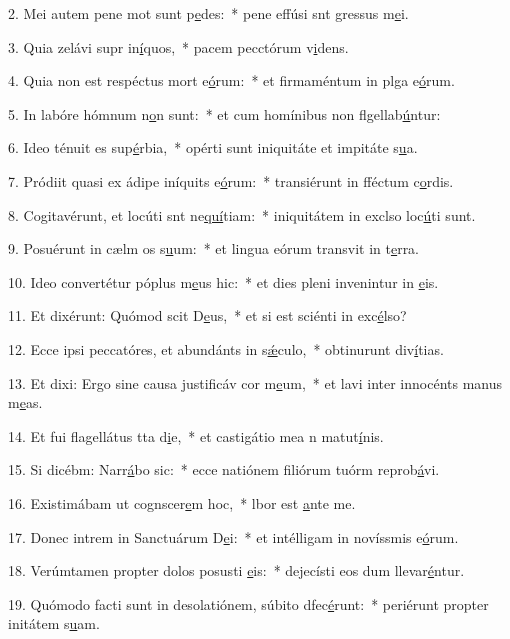 2. Mei autem pene mot sunt p\uline{e}des:~* pene effúsi snt gressus m\uline{e}i.\par 
3. Quia zelávi supr in\uline{í}quos,~* pacem pecctórum v\uline{i}dens.\par 
4. Quia non est respéctus mort e\uline{ó}rum:~* et firmaméntum in plga e\uline{ó}rum.\par 
5. In labóre hómnum n\uline{o}n sunt:~* et cum homínibus non flgellab\uline{ú}ntur:\par 
6. Ideo ténuit es sup\uline{é}rbia,~* opérti sunt iniquitáte et impitáte s\uline{u}a.\par 
7. Pródiit quasi ex ádipe iníquits e\uline{ó}rum:~* transiérunt in fféctum c\uline{o}rdis.\par 
8. Cogitavérunt, et locúti snt ne\uline{quí}tiam:~* iniquitátem in exclso loc\uline{ú}ti sunt.\par 
9. Posuérunt in cælm os s\uline{u}um:~* et lingua eórum transvit in t\uline{e}rra.\par 
10. Ideo convertétur póplus m\uline{e}us hic:~* et dies pleni invenintur in \uline{e}is.\par 
11. Et dixérunt: Quómod scit D\uline{e}us,~* et si est sciénti in exc\uline{é}lso?\par 
12. Ecce ipsi peccatóres, et abundánts in s\uline{ǽ}culo,~* obtinurunt div\uline{í}tias.\par 
13. Et dixi: Ergo sine causa justificáv cor m\uline{e}um,~* et lavi inter innocénts manus m\uline{e}as.\par 
14. Et fui flagellátus tta d\uline{i}e,~* et castigátio mea n matut\uline{í}nis.\par 
15. Si dicébm: Narr\uline{á}bo sic:~* ecce natiónem filiórum tuórm reprob\uline{á}vi.\par 
16. Existimábam ut cognscer\uline{e}m hoc,~* lbor est \uline{a}nte me.\par 
17. Donec intrem in Sanctuárum D\uline{e}i:~* et intélligam in novíssmis e\uline{ó}rum.\par 
18. Verúmtamen propter dolos posusti \uline{e}is:~* dejecísti eos dum llevar\uline{é}ntur.\par 
19. Quómodo facti sunt in desolatiónem, súbito dfec\uline{é}runt:~* periérunt propter initátem s\uline{u}am.\par 
